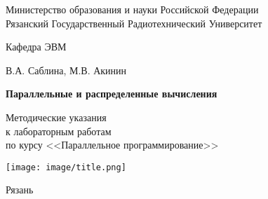 
\begin{titlepage}

\begin{center}

Министерство образования и науки Российской Федерации \\
Рязанский Государственный Радиотехнический Университет

\bigskip

Кафедра ЭВМ

\vspace{5em}

В.А. Саблина, М.В. Акинин

\vspace{3em}

{\Large \bf Параллельные и распределенные вычисления}

\vspace{3em}

Методические указания\\
к лабораторным работам\\
по курсу <<Параллельное программирование>>

\vfill

\texttt{[image: image/title.png]}

\vfill

Рязань \the\year

\end{center}

\thispagestyle{empty}

\end{titlepage}

\setcounter{page}{2}

\clearpage

